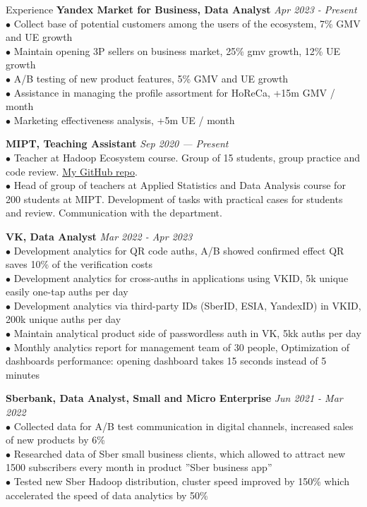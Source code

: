 \documentclass{resume} %
\begin{document}
\begin{rSection}{ Experience }
    { \bf Yandex Market for Business, Data Analyst} \hfill {\em Apr 2023 - Present}\\
    { $\bullet$ Collect base of potential customers among the users of the ecosystem, 7\% GMV and UE growth } \\
    { $\bullet$ Maintain opening 3P sellers on business market, 25\% gmv growth, 12\% UE growth} \\
    { $\bullet$ A/B testing of new product features, 5\% GMV and UE growth} \\ 
    { $\bullet$ Assistance in managing the profile assortment for HoReCa, +15m GMV / month} \\
    { $\bullet$ Marketing effectiveness analysis, +5m UE / month}

    { \bf MIPT, Teaching Assistant} \hfill {\em Sep 2020 — Present}\\
    { $\bullet$ Teacher at Hadoop Ecosystem course. Group of 15 students, group practice and code review. \href{https://github.com/YHx07/pd-seminars}{My GitHub repo}.}\\
    { $\bullet$ Head of group of teachers at Applied Statistics and Data Analysis course for 200 students at MIPT. Development of tasks with practical cases for students and review. Communication with the department. }

    { \bf VK, Data Analyst} \hfill {\em Mar 2022 - Apr 2023}\\
    { $\bullet$ Development analytics for QR code auths, A/B showed confirmed effect QR saves 10\% of the verification costs} \\
    { $\bullet$ Development analytics for cross-auths in applications using VKID, 5k unique easily one-tap auths per day}\\
    { $\bullet$ Development analytics via third-party IDs (SberID, ESIA, YandexID) in VKID, 200k unique auths per day}\\
    { $\bullet$ Maintain analytical product side of passwordless auth in VK, 5kk auths per day }\\
    {$\bullet$ Monthly analytics report for management team of 30 people, Optimization of dashboards performance: opening dashboard takes 15 seconds instead of 5 minutes}

    { \bf Sberbank, Data Analyst, Small and Micro Enterprise} \hfill {\em Jun 2021 - Mar 2022}\\
    { $\bullet$ Collected data for A/B test communication in digital channels, increased sales of new products by 6\% }\\
    { $\bullet$ Researched data of Sber small business clients, which allowed to attract new 1500 subscribers every month in product ''Sber business app'' }\\
    { $\bullet$ Tested new Sber Hadoop distribution, cluster speed improved by 150\% which accelerated the speed of data analytics by 50\%}
    

\end{rSection}
\end{document}
